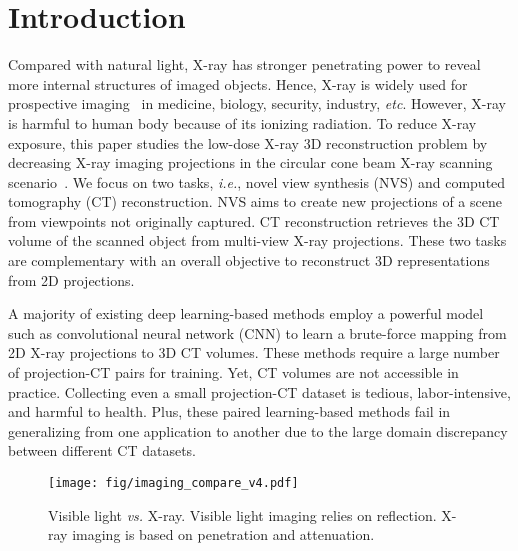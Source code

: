 \documentclass[10pt,twocolumn,letterpaper]{article}
\begin{document}
\vspace{-5.5mm}
\section{Introduction}
\vspace{-1.5mm}
\label{sec:intro}

Compared with natural light, X-ray has stronger penetrating power to reveal more internal structures of imaged objects. Hence, X-ray is widely used for prospective imaging~\cite{x_ray_1,x_ray_2,x_ray_3,x_ray_4} in  medicine, biology, security, industry, \emph{etc}. However, X-ray is harmful to human body because of its ionizing radiation. To reduce X-ray exposure, this paper studies the low-dose X-ray 3D reconstruction problem by decreasing X-ray imaging projections in the circular cone beam X-ray scanning scenario~\cite{cbct,mv_x_2,mv_x_1,mv_x_3,cbct_3}.
We focus on two tasks, \emph{i.e.}, novel view synthesis (NVS) and computed tomography (CT) reconstruction. NVS aims to create new projections of a scene from viewpoints not originally captured. CT reconstruction retrieves the 3D CT volume of the scanned object from multi-view X-ray projections. These two tasks are complementary with an overall objective to reconstruct 3D representations from 2D projections.

A majority of existing deep learning-based methods employ a powerful model such as convolutional neural network (CNN) to learn a brute-force mapping from 2D  X-ray projections to 3D CT volumes. These methods require a large number of projection-CT pairs for training. Yet, CT volumes are not accessible in practice. Collecting even a small projection-CT dataset is tedious, labor-intensive, and harmful to health. Plus, these paired learning-based methods fail in generalizing from one application to another due to the large domain discrepancy between different CT datasets.

\begin{figure}[t]
	\centering
	\hspace{1mm}
	\texttt{[image: fig/imaging\_compare\_v4.pdf]} 
	\vspace{-6mm}
	\caption{Visible light \emph{vs.} X-ray. Visible light imaging relies on reflection. X-ray imaging is based on penetration and attenuation.}
	\vspace{-4mm}
	\label{fig:imaging_compare}
\end{figure}
\end{document}
